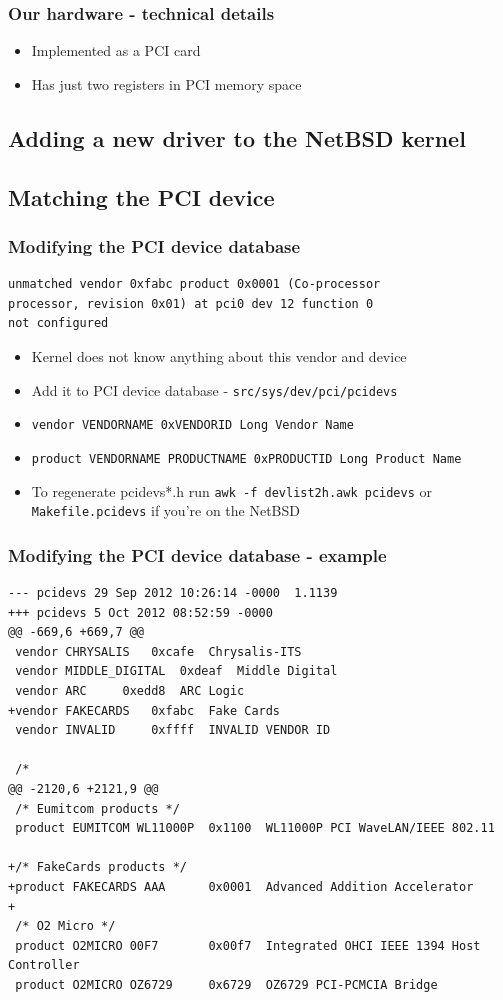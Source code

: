 \documentclass[dvipsnames,table]{beamer}
\begin{document}
\begin{frame}
\frametitle{Our hardware - technical details}
\begin{itemize}
	\item Implemented as a PCI card
	\item Has just two registers in PCI memory space
\end{itemize}
\end{frame}

\subsection{Adding a new driver to the NetBSD kernel}

\subsection{Matching the PCI device}

\begin{frame}[fragile]
\frametitle{Modifying the PCI device database}
\begin{verbatim}
unmatched vendor 0xfabc product 0x0001 (Co-processor 
processor, revision 0x01) at pci0 dev 12 function 0 
not configured
\end{verbatim}
\begin{itemize}
	\item Kernel does not know anything about this vendor and device
	\item Add it to PCI device database - {\tt src/sys/dev/pci/pcidevs}
	\item {\tt vendor VENDORNAME 0xVENDORID Long Vendor Name}
	\item {\tt product VENDORNAME PRODUCTNAME 0xPRODUCTID	Long Product Name}
	\item To regenerate pcidevs*.h run {\tt awk -f devlist2h.awk pcidevs} or
{\tt Makefile.pcidevs} if you're on the NetBSD
\end{itemize}
\end{frame}

\begin{frame}[fragile]
\frametitle{Modifying the PCI device database - example}
\scriptsize
\begin{verbatim}
--- pcidevs	29 Sep 2012 10:26:14 -0000	1.1139
+++ pcidevs	5 Oct 2012 08:52:59 -0000
@@ -669,6 +669,7 @@
 vendor CHRYSALIS	0xcafe	Chrysalis-ITS
 vendor MIDDLE_DIGITAL	0xdeaf	Middle Digital
 vendor ARC		0xedd8	ARC Logic
+vendor FAKECARDS	0xfabc	Fake Cards
 vendor INVALID		0xffff	INVALID VENDOR ID
 
 /*
@@ -2120,6 +2121,9 @@
 /* Eumitcom products */
 product EUMITCOM WL11000P	0x1100	WL11000P PCI WaveLAN/IEEE 802.11
 
+/* FakeCards products */
+product FAKECARDS AAA		0x0001	Advanced Addition Accelerator
+
 /* O2 Micro */
 product O2MICRO 00F7		0x00f7	Integrated OHCI IEEE 1394 Host Controller
 product O2MICRO OZ6729		0x6729	OZ6729 PCI-PCMCIA Bridge
\end{verbatim}
\end{frame}
\end{document}
